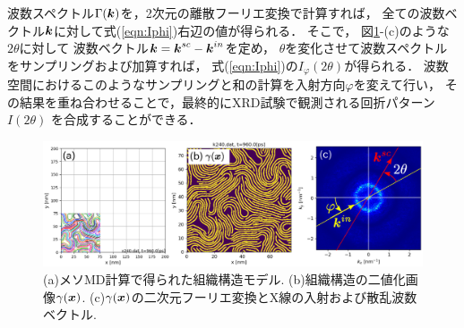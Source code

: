 波数スペクトル$\Gamma(\mbox{\boldmath $k$})$を，2次元の離散フーリエ変換で計算すれば，
全ての波数ベクトル$\mbox{\boldmath $k$}$に対して式(\ref{eqn:Iphi})右辺の値が得られる．
そこで，
図\ref{fig:fig5}-(c)のような$2\theta$に対して
波数ベクトル$\mbox{\boldmath $k$}=\mbox{\boldmath $k$}^{sc}-\mbox{\boldmath $k$}^{in}$を定め，
$\theta$を変化させて波数スペクトルをサンプリングおよび加算すれば，
式(\ref{eqn:Iphi})の$I_\varphi(2\theta)$が得られる．
波数空間におけるこのようなサンプリングと和の計算を入射方向$\varphi$を変えて行い，
その結果を重ね合わせることで，最終的にXRD試験で観測される回折パターン$I(2\theta)$
を合成することができる．
\begin{figure}[h]
	\begin{center}
	\includegraphics[width=1.0\linewidth]{Figs/fig5.eps} 
	\end{center}
	\caption{
		(a)メソMD計算で得られた組織構造モデル.
		(b)組織構造の二値化画像$\gamma(\mbox{\boldmath $x$})$. 
		(c)$\gamma(\mbox{\boldmath $x$})$の二次元フーリエ変換とX線の入射および散乱波数ベクトル.
	} 
	\label{fig:fig5}
\end{figure}
